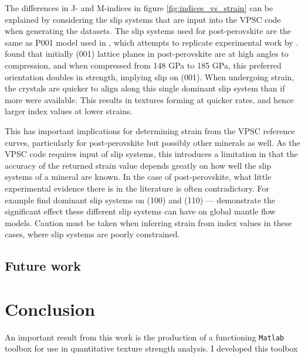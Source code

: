 \documentclass[a4paper,12pt,twoside]{report}
\numberwithin{equation}{chapter}
\begin{document}
The differences in J- and M-indices in figure \ref{fig:indices_vs_strain} can be explained by considering the slip systems that are input into the VPSC code when generating the datasets. The slip systems used for post-perovskite are the same as P001 model used in \cite{Walker2012}, which attempts to replicate experimental work by \citep{Miyagi2010}. \cite{Miyagi2010} found that initially (001) lattice planes in post-perovskite are at high angles to compression, and when compressed from 148 GPa to 185 GPa, this preferred orientation doubles in strength, implying slip on (001). When undergoing strain, the crystals are quicker to align along this single dominant slip system than if more were available. This results in textures forming at quicker rates, and hence larger index values at lower strains.

This has important implications for determining strain from the VPSC reference curves, particularly for post-perovskite but possibly other minerals as well. As the VPSC code requires input of slip systems, this introduces a limitation in that the accuracy of the returned strain value depends greatly on how well the slip systems of a mineral are known. In the case of post-perovskite, what little experimental evidence there is in the literature is often contradictory. For example \cite{Merkel2007} find dominant slip systems on (100) and (110) --- \cite{Walker2012} demonstrate the significant effect these different slip systems can have on global mantle flow models. Caution must be taken when inferring strain from index values in these cases, where slip systems are poorly constrained.  
  


\section{Future work}


\chapter{Conclusion} \label{chap:conclusion}
\vspace{-1cm}
An important result from this work is the production of a functioning \texttt{Matlab} toolbox for use in quantitative texture strength analysis. I developed this toolbox 
\end{document}
